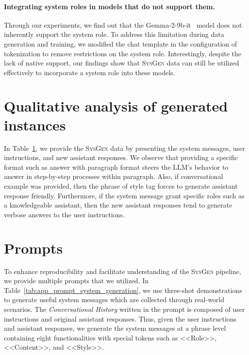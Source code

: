 \paragraph{Integrating system roles in models that do not support them.}
\label{app:system_role_support}
Through our experiments, we find out that the Gemma-2-9b-it~\citep{team2024gemma} model does not inherently support the system role.
To address this limitation during data generation and training, we modified the chat template in the configuration of tokenization to remove restrictions on the system role.
Interestingly, despite the lack of native support, our findings show that \textsc{SysGen} data can still be utilized effectively to incorporate a system role into these models.

\section{Qualitative analysis of generated instances}
\label{app:qualitative_analysis}


In Table~\ref{app:qualitative_analysis}, we provide the \textsc{SysGen} data by presenting the system messages, user instructions, and new assistant responses.
We observe that providing a specific format such as answer with paragraph format steers the LLM's behavior to answer in step-by-step processes within paragraph.
Also, if conversational example was provided, then the phrase of style tag forces to generate assistant response friendly.
Furthermore, if the system message grant specific roles such as a knowledgeable assistant, then the new assistant responses tend to generate verbose answers to the user instructions.

\section{Prompts}
\label{app:prompt}
To enhance reproducibility and facilitate understanding of the \textsc{SysGen} pipeline, we provide multiple prompts that we utilized.
In Table~\ref{tab:app_prompt_system_generation}, we use three-shot demonstrations to generate useful system messages which are collected through real-world scenarios.
The \textit{Conversational History} written in the prompt is composed of user instructions and original assistant responses.
Thus, given the user instructions and assistant responses, we generate the system messages at a phrase level containing eight functionalities with special tokens such as <<Role>>, <<Content>>, and <<Style>>.


